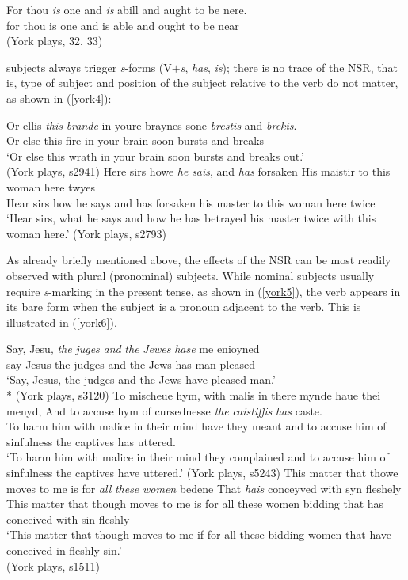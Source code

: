 \documentclass[output=paper]{langsci/langscibook}
\begin{document}
\ea
\gll For thou \textit{is} one and \textit{is} abill and aught to be nere.\\
for thou is one and is able and ought to be near\\
\glt (York plays, 32, 33)
\z

\Tsg{} subjects always trigger \emph{s}-forms (V$+$\emph{s}, \emph{has},
\emph{is}); there is no trace of the \gls{NSR}, that
is, type of subject and position of the subject relative to the verb do not
matter, as shown in (\ref{york4}):

\ea
\label{york4}
\ea \gll Or ellis \textit{this} \textit{brande} in youre braynes sone \textit{brestis} and \textit{brekis}.\\
Or else this fire in your brain soon bursts and breaks\\
\glt `Or else this wrath in your brain soon bursts and breaks out.'\\
(York plays, s2941)
\ex \gll Here sirs howe \textit{he} \textit{sais}, and \textit{has} forsaken His maistir to this woman here twyes \\
Hear sirs how he says and has forsaken his master to this woman here twice\\
\glt `Hear sirs, what he says and how he has betrayed his master twice with this woman here.' (York plays, s2793)
\z
\z

As already briefly mentioned above, the effects of the \gls{NSR} can be most readily observed with plural (pronominal) subjects. While nominal \Tpl{} subjects usually require \emph{s}-marking in the present tense, as shown in (\ref{york5}), the verb appears in its bare form when the subject is a pronoun adjacent to the verb. This is illustrated in (\ref{york6}).

\ea
\label{york5}
\ea
\gll Say, Jesu, \textit{the} \textit{juges} \textit{and} \textit{the} \textit{Jewes} \textit{hase} me enioyned\\
say Jesus the judges and the Jews has man pleased\\
\glt `Say, Jesus, the judges and the Jews have pleased man.'\\*
(York plays, s3120)
\ex
\gll To mischeue hym, with malis in there mynde haue thei menyd,
And to accuse hym of cursednesse \textit{the} \textit{caistiffis} \textit{has} caste. \\
To harm him with malice in their mind have they meant and to accuse him of sinfulness the captives has uttered.\\
\glt `To harm him with malice in their mind they  complained and to accuse him of sinfulness the captives have uttered.' (York plays, s5243)
\ex
\gll This matter that thowe moves to me is for \textit{all} \textit{these} \textit{women} bedene That \textit{hais} conceyved with syn fleshely \\
    This matter that though moves to me is for all these women bidding that has conceived with sin fleshly\\
\glt `This matter that though moves to me if for all these bidding women that have conceived in fleshly sin.'\\
(York plays, s1511)
\z
\z
\end{document}
